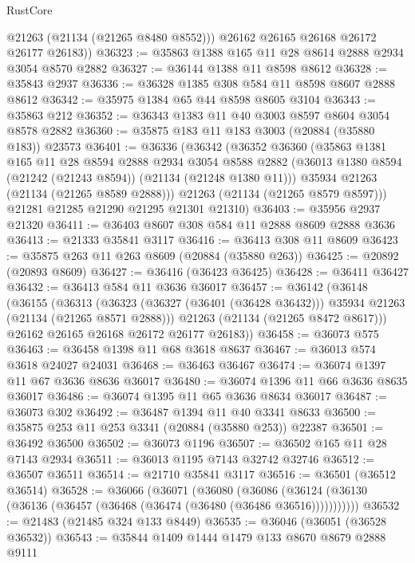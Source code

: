 \begin{lexlean}{RustCore}
\begin{coremodule}
          @21263
          (@21134 (@21265 @8480 @8552)))
        @26162
        @26165
        @26168
        @26172
        @26177
        @26183))
@36323 := @35863 @1388 @165 @11 @28 @8614 @2888 @2934 @3054 @8570 @2882
@36327 := @36144 @1388 @11 @8598 @8612
@36328 := @35843 @2937
@36336 := @36328 @1385 @308 @584 @11 @8598 @8607 @2888 @8612
@36342 := @35975 @1384 @65 @44 @8598 @8605 @3104
@36343 := @35863 @212
@36352 := @36343 @1383 @11 @40 @3003 @8597 @8604 @3054 @8578 @2882
@36360 := @35875 @183 @11 @183 @3003 (@20884 (@35880 @183)) @23573
@36401 := @36336
    (@36342
      (@36352
        @36360
        (@35863
          @1381
          @165
          @11
          @28
          @8594
          @2888
          @2934
          @3054
          @8588
          @2882
          (@36013 @1380 @8594 (@21242 (@21243 @8594)) (@21134 (@21248 @1380 @11)))
          @35934
          @21263
          (@21134 (@21265 @8589 @2888)))
        @21263
        (@21134 (@21265 @8579 @8597)))
      @21281
      @21285
      @21290
      @21295
      @21301
      @21310)
@36403 := @35956 @2937 @21320
@36411 := @36403 @8607 @308 @584 @11 @2888 @8609 @2888 @3636
@36413 := @21333 @35841 @3117
@36416 := @36413 @308 @11 @8609
@36423 := @35875 @263 @11 @263 @8609 (@20884 (@35880 @263))
@36425 := @20892 (@20893 @8609)
@36427 := @36416 (@36423 @36425)
@36428 := @36411 @36427
@36432 := @36413 @584 @11 @3636 @36017
@36457 := @36142
    (@36148
      (@36155
        (@36313
          (@36323 (@36327 (@36401 (@36428 @36432))) @35934 @21263 (@21134 (@21265 @8571 @2888)))
          @21263
          (@21134 (@21265 @8472 @8617)))
        @26162
        @26165
        @26168
        @26172
        @26177
        @26183))
@36458 := @36073 @575
@36463 := @36458 @1398 @11 @68 @3618 @8637
@36467 := @36013 @574 @3618 @24027 @24031
@36468 := @36463 @36467
@36474 := @36074 @1397 @11 @67 @3636 @8636 @36017
@36480 := @36074 @1396 @11 @66 @3636 @8635 @36017
@36486 := @36074 @1395 @11 @65 @3636 @8634 @36017
@36487 := @36073 @302
@36492 := @36487 @1394 @11 @40 @3341 @8633
@36500 := @35875 @253 @11 @253 @3341 (@20884 (@35880 @253)) @22387
@36501 := @36492 @36500
@36502 := @36073 @1196
@36507 := @36502 @165 @11 @28 @7143 @2934
@36511 := @36013 @1195 @7143 @32742 @32746
@36512 := @36507 @36511
@36514 := @21710 @35841 @3117
@36516 := @36501 (@36512 @36514)
@36528 := @36066
    (@36071
      (@36080
        (@36086 (@36124 (@36130 (@36136 (@36457 (@36468 (@36474 (@36480 (@36486 @36516)))))))))))
@36532 := @21483 (@21485 @324 @133 @8449)
@36535 := @36046 (@36051 (@36528 @36532))
@36543 := @35844 @1409 @1444 @1479 @133 @8670 @8679 @2888 @9111

\end{coremodule}
\end{lexlean}
